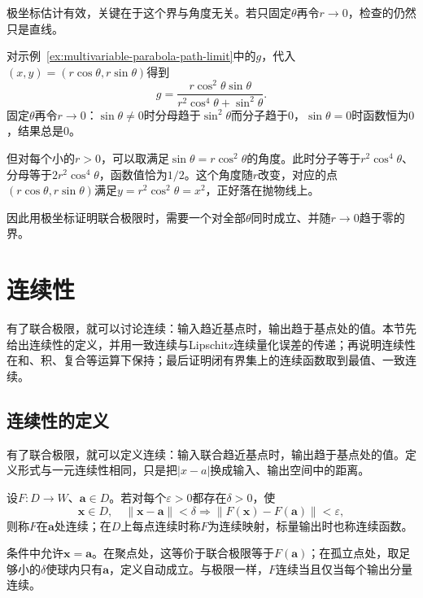 极坐标估计有效，关键在于这个界与角度无关。若只固定$\theta$再令$r\to0$，检查的仍然只是直线。
\begin{example}[固定角度的极坐标检验]
\label{ex:multivariable-polar-fixed-angle}
对示例~\ref{ex:multivariable-parabola-path-limit}中的$g$，代入$(x,y)=(r\cos\theta,r\sin\theta)$得到
\[
 g=\frac{r\cos^2\theta\sin\theta}{r^2\cos^4\theta+\sin^2\theta}.
\]
固定$\theta$再令$r\to0$：$\sin\theta\neq0$时分母趋于$\sin^2\theta$而分子趋于$0$，$\sin\theta=0$时函数恒为$0$，结果总是$0$。

但对每个小的$r>0$，可以取满足$\sin\theta=r\cos^2\theta$的角度。此时分子等于$r^2\cos^4\theta$、分母等于$2r^2\cos^4\theta$，函数值恰为$1/2$。这个角度随$r$改变，对应的点$(r\cos\theta,r\sin\theta)$满足$y=r^2\cos^2\theta=x^2$，正好落在抛物线上。
\end{example}

因此用极坐标证明联合极限时，需要一个对全部$\theta$同时成立、并随$r\to0$趋于零的界。

\section{连续性}
\label{sec:multivariable-continuity}

有了联合极限，就可以讨论连续：输入趋近基点时，输出趋于基点处的值。本节先给出连续性的定义，并用一致连续与Lipschitz连续量化误差的传递；再说明连续性在和、积、复合等运算下保持；最后证明闭有界集上的连续函数取到最值、一致连续。

\subsection{连续性的定义}
\label{sec:multivariable-continuity-definition}

有了联合极限，就可以定义连续：输入联合趋近基点时，输出趋于基点处的值。定义形式与一元连续性相同，只是把$|x-a|$换成输入、输出空间中的距离。
\begin{definition}[映射的连续性]
\label{def:multivariable-scalar-continuity}
设$F:D\to W$、$\bm a\in D$。若对每个$\varepsilon>0$都存在$\delta>0$，使
\[
 \bm x\in D,\quad\lVert\bm x-\bm a\rVert<\delta
 \Longrightarrow \lVert F(\bm x)-F(\bm a)\rVert<\varepsilon,
\]
则称$F$在$\bm a$处连续；在$D$上每点连续时称$F$为连续映射，标量输出时也称连续函数。
\end{definition}
条件中允许$\bm x=\bm a$。在聚点处，这等价于联合极限等于$F(\bm a)$；在孤立点处，取足够小的$\delta$使球内只有$\bm a$，定义自动成立。与极限一样，$F$连续当且仅当每个输出分量连续。

